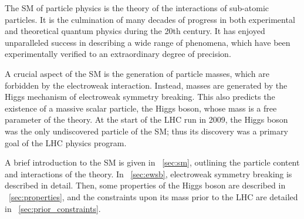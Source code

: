 
The \ac{SM} of particle physics is the theory of the interactions of sub-atomic particles.
It is the culmination of many decades of progress in both experimental and theoretical
quantum physics during the 20th century. It has enjoyed unparalleled success in describing 
a wide range of phenomena, which have been experimentally verified to an extraordinary 
degree of precision.

A crucial aspect of the \ac{SM} is the generation of particle masses, which are forbidden
by the electroweak interaction. Instead, masses are generated by the Higgs mechanism of
electroweak symmetry breaking. This also predicts the existence of a massive scalar
particle, the Higgs boson, whose mass is a free parameter of the theory. At the start of 
the \acs{LHC} run in 2009, the Higgs boson was the only undiscovered particle of the 
\ac{SM}; thus its discovery was a primary goal of the \acs{LHC} physics program.

A brief introduction to the \ac{SM} is given in \Section~\ref{sec:sm}, outlining the 
particle content and interactions of the theory. In \Section~\ref{sec:ewsb}, electroweak 
symmetry breaking is described in detail. Then, some properties of the Higgs boson are 
described in \Section~\ref{sec:properties}, and the constraints upon its mass prior to the 
\acs{LHC} are detailed in \Section~\ref{sec:prior_constraints}.

